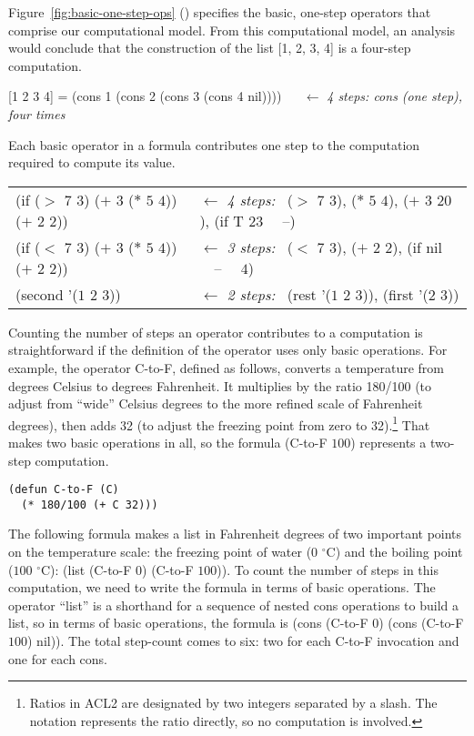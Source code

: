 Figure~\ref{fig:basic-one-step-ops} (\pageref{fig:basic-one-step-ops})
specifies the basic, one-step operators that comprise
our computational model.
From this computational model, an analysis would conclude
that the construction of the list [1, 2, 3, 4] is a
four-step computation.

\begin{center}
[1 2 3 4] = (cons 1 (cons 2 (cons 3 (cons 4 nil)))) ~~ $\leftarrow$ \emph{4 steps: cons (one step), four times}
\end{center}

Each basic operator in a formula contributes one step
to the computation required to compute its value.

\begin{center}
\begin{tabular}{ll}
    (if ($>$ $7$ $3$) ($+$ $3$ ($*$ $5$ $4$)) ($+$ $2$ $2$)) & $\leftarrow$ \emph{4 steps:}~ ($>$ $7$ $3$), ($*$ $5$ $4$), ($+$ $3$ $20$), (if T $23$ ~~--) \\
    (if ($<$ $7$ $3$) ($+$ $3$ ($*$ $5$ $4$)) ($+$ $2$ $2$)) & $\leftarrow$ \emph{3 steps:}~ ($<$ $7$ $3$), ($+$ $2$ $2$), (if nil ~~--~~ $4$) \\
    (second '($1$ $2$ $3$))                                  & $\leftarrow$ \emph{2 steps:}~ (rest '($1$ $2$ $3$)), (first '($2$ $3$))
\end{tabular}
\end{center}

Counting the number of steps an operator
contributes to a computation is straightforward
if the definition of the operator uses only basic operations.
For example, the operator C-to-F, defined
as follows, converts a temperature from degrees Celsius to
degrees Fahrenheit. It multiplies by the ratio 180/100
(to adjust from ``wide'' Celsius degrees to the
more refined scale of Fahrenheit degrees), then adds 32
(to adjust the freezing point from zero to 32).\footnote{Ratios
in ACL2 are designated
by two integers separated by a slash. The notation represents
the ratio directly, so no computation is involved.}
That makes two basic operations in all, so the formula
(C-to-F $100$) represents a two-step computation.

\begin{Verbatim}
(defun C-to-F (C)
  (* 180/100 (+ C 32)))
\end{Verbatim}

The following formula makes a list in Fahrenheit degrees of two important
points on the temperature scale:
the freezing point of water ($0$ $^\circ$C) and the boiling point ($100$ $^\circ$C):
(list (C-to-F $0$) (C-to-F $100$)).
To count the number of steps in this computation,
we need to write the formula in terms of basic operations.
The operator ``list'' is a shorthand for a sequence of nested
cons operations to build a list,
so in terms of basic operations, the formula is
(cons (C-to-F $0$) (cons (C-to-F $100$) nil)).
The total step-count comes to six: two for each C-to-F invocation
and one for each cons.

